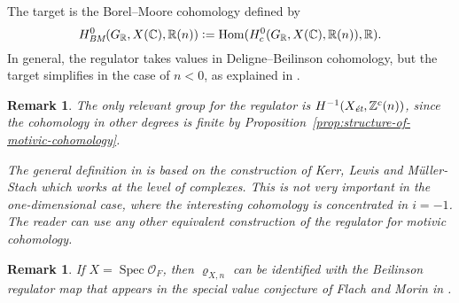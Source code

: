 \documentclass{article}
\DeclareMathOperator{\Hom}{Hom}
\DeclareMathOperator{\Spec}{Spec}
\newcommand{\CC}{\mathbb{C}}
\newcommand{\RR}{\mathbb{R}}
\newcommand{\ZZ}{\mathbb{Z}}
\newcommand{\BM}{\text{\it BM}}
\newcommand{\et}{\text{\it \'{e}t}}
\newcommand{\dfn}{\mathrel{\mathop:}=}
\theoremstyle{myplain}
\theoremstyle{mydefinition}
\newtheorem{remark}[theorem]{Remark}
\begin{document}
The target is the Borel--Moore cohomology defined by
\[ H^0_\BM (G_\RR, X(\CC), \RR(n)) \dfn
  \Hom (H^0_c (G_\RR, X(\CC), \RR(n)), \RR). \]
In general, the regulator takes values in Deligne--Beilinson cohomology, but the
target simplifies in the case of $n < 0$, as explained in
\cite[\S 2]{Beshenov-Weil-etale-2}.

\begin{remark}
  The only relevant group for the regulator is $H^{-1} (X_\et, \ZZ^c (n))$,
  since the cohomology in other degrees is finite by
  Proposition~\ref{prop:structure-of-motivic-cohomology}.

  The general definition in \cite[\S 2]{Beshenov-Weil-etale-2} is based on the
  construction of Kerr, Lewis and M\"{u}ller-Stach
  \cite{Kerr-Lewis-Muller-Stach-2006} which works at the level of
  complexes. This is not very important in the one-dimensional case, where the
  interesting cohomology is concentrated in $i = -1$. The reader can use any
  other equivalent construction of the regulator for motivic cohomology.
\end{remark}

\begin{remark}
  If $X = \Spec \mathcal{O}_F$, then $\varrho_{X,n}$ can be identified with the
  Beilinson regulator map that appears in the special value conjecture of Flach
  and Morin in \cite[\S 5.8.3]{Flach-Morin-2018}.
\end{remark}
\end{document}
